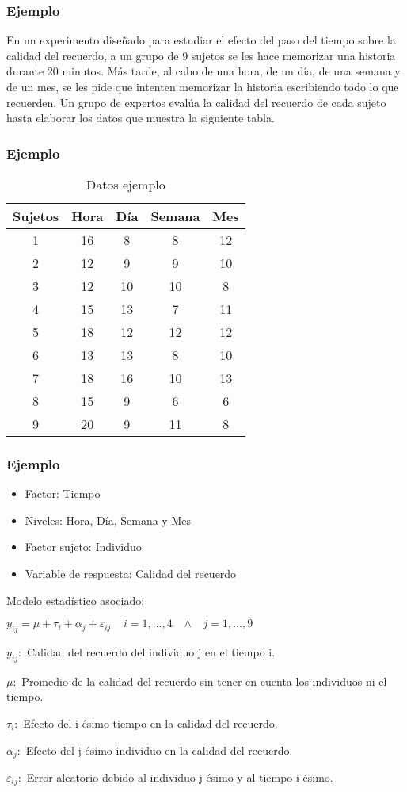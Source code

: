 \documentclass[12pt]{beamer}
\begin{document}
\begin{frame}
\frametitle{Ejemplo}
En un experimento diseñado para estudiar el efecto del paso del tiempo sobre la calidad del recuerdo, a un grupo de 9 sujetos se les hace memorizar una historia durante 20 minutos. Más tarde, al cabo de una hora, de un día, de una semana y de un mes, se les pide que intenten memorizar la historia escribiendo todo lo que recuerden. Un grupo de expertos evalúa la calidad del recuerdo de cada sujeto hasta elaborar los datos que muestra la siguiente tabla.
\end{frame}

\begin{frame}
\frametitle{Ejemplo}
\begin{table}[htbp]
  \centering
\resizebox{10cm}{!} {
\begin{tabular}{|c|c|c|c|c|}
\hline 
\textbf{Sujetos} & \textbf{Hora} & \textbf{Día} & \textbf{Semana} & \textbf{Mes}\\ 
\hline 
1 & 16 & 8 & 8 & 12\\
2 & 12 &9& 9& 10\\
3 &12 &10& 10& 8\\
4 &15 &13& 7& 11\\
5 &18 &12 &12& 12\\
6 &13 & 13 & 8 &10\\
7 & 18 & 16 & 10 & 13\\
8 & 15 & 9 & 6 & 6 \\
9 & 20 & 9 & 11 & 8\\
\hline 
\end{tabular} 
}
\caption{Datos ejemplo}
\label{tab:addlabel}%
\end{table}%
\end{frame}

\begin{frame}
\frametitle{Ejemplo}
\begin{itemize}
\item Factor: Tiempo
\item Niveles: Hora, Día, Semana y Mes
\item Factor sujeto: Individuo
\item Variable de respuesta: Calidad del recuerdo
\end{itemize}
Modelo estadístico asociado:
\begin{center}
$y_{ij}=\mu+\tau_i+\alpha_j+\varepsilon_{ij} \;\;\;\; i=1,...,4 \;\;\;  \wedge \;\;\; j=1,...,9$
\end{center}
$y_{ij}:$ Calidad del recuerdo del individuo j en el tiempo i.

$\mu:$ Promedio de la calidad del recuerdo sin tener en cuenta los individuos ni el tiempo.

$\tau_i:$ Efecto del i-ésimo tiempo en la calidad del recuerdo.

$\alpha_j:$ Efecto del j-ésimo individuo en la calidad del recuerdo.

$\varepsilon_{ij}:$ Error aleatorio debido al individuo j-ésimo y al tiempo i-ésimo.
\end{frame}
\end{document}
